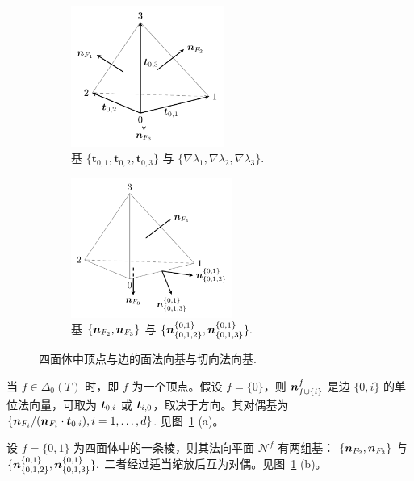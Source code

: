 \begin{figure}[htbp]
  \centering
  \begin{subfigure}{0.49\textwidth} %
  \centering
    \includegraphics[width=5cm]{figures/Tbasis.pdf}
    \caption{基 $\{\boldsymbol{t}_{0,1}, \boldsymbol{t}_{0,2}, \boldsymbol{t}_{0,3}\}$ 与 $\{\nabla \lambda_1, \nabla \lambda_2, \nabla \lambda_3\}$.}
  \end{subfigure}
  \hfill %
  \begin{subfigure}{0.49\textwidth}
  \centering
    \includegraphics[width=5.3cm]{figures/Tedgebasis.pdf}
    \caption{基 $\{\boldsymbol n_{F_2}, \boldsymbol n_{F_3}\}$ 与 $\{ \boldsymbol n^{\{0,1\}}_{\{0,1,2\}}, \boldsymbol n^{\{0,1\}}_{\{0,1,3\}}\}.$}
  \end{subfigure}
  \caption{四面体中顶点与边的面法向基与切向法向基.}\label{fig:normalbasis}
\end{figure}




\begin{example}\rm
当 $f\in \Delta_0(T)$ 时，即 $f$ 为一个顶点。假设 $f=\{0\}$，则 $\boldsymbol n_{f\cup\{i\}}^f$ 是边 $\{0,i\}$ 的单位法向量，可取为 $\boldsymbol t_{0,i}$ 或 $\boldsymbol t_{i,0}$，取决于方向。其对偶基为 $\{\boldsymbol n_{F_i}/(\boldsymbol n_{F_i}\cdot \boldsymbol t_{0,i}), i=1, \ldots, d\}$. 见图~\ref{fig:normalbasis} (a)。
\end{example}


\begin{example}\rm
设 $f=\{0,1\}$ 为四面体中的一条棱，则其法向平面 $\mathscr N^f$ 有两组基：
$\{\boldsymbol n_{F_2}, \boldsymbol n_{F_3}\}$ 与 $\{ \boldsymbol n^{\{0,1\}}_{\{0,1,2\}}, \boldsymbol n^{\{0,1\}}_{\{0,1,3\}}\}.$
二者经过适当缩放后互为对偶。见图~\ref{fig:normalbasis} (b)。 
\end{example}


